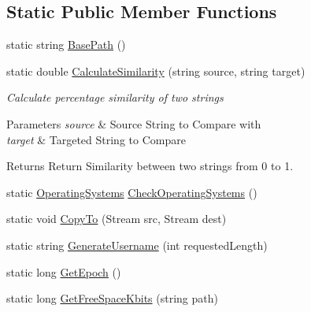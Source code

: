 \subsection*{Static Public Member Functions}
\begin{DoxyCompactItemize}
\item 
static string \mbox{\hyperlink{class_little_weeb_library_1_1_static_classes_1_1_utility_methods_a9fe4cf5d219f0453436fe9c85ad261bf}{Base\+Path}} ()
\item 
static double \mbox{\hyperlink{class_little_weeb_library_1_1_static_classes_1_1_utility_methods_a376120497e647e8c20d6a68c288db292}{Calculate\+Similarity}} (string source, string target)
\begin{DoxyCompactList}\small\item\em Calculate percentage similarity of two strings 
\begin{DoxyParams}{Parameters}
{\em source} & Source String to Compare with\\
\hline
{\em target} & Targeted String to Compare\\
\hline
\end{DoxyParams}
\begin{DoxyReturn}{Returns}
Return Similarity between two strings from 0 to 1.
\end{DoxyReturn}
\end{DoxyCompactList}\item 
static \mbox{\hyperlink{class_little_weeb_library_1_1_static_classes_1_1_utility_methods_aad4a2807f22b8cb65b8db3cdc981a0b1}{Operating\+Systems}} \mbox{\hyperlink{class_little_weeb_library_1_1_static_classes_1_1_utility_methods_afc8c716f32bc35d59afdb287be06c3ca}{Check\+Operating\+Systems}} ()
\item 
static void \mbox{\hyperlink{class_little_weeb_library_1_1_static_classes_1_1_utility_methods_a4a514b7e55cf2285f4f16d778164695d}{Copy\+To}} (Stream src, Stream dest)
\item 
static string \mbox{\hyperlink{class_little_weeb_library_1_1_static_classes_1_1_utility_methods_a9304b6462a585dd9afa13818452638a7}{Generate\+Username}} (int requested\+Length)
\item 
static long \mbox{\hyperlink{class_little_weeb_library_1_1_static_classes_1_1_utility_methods_a12336d9e64983ddabaad8950486fafb2}{Get\+Epoch}} ()
\item 
static long \mbox{\hyperlink{class_little_weeb_library_1_1_static_classes_1_1_utility_methods_a76fa2aea99ce4b1ad4130cc18b1d5969}{Get\+Free\+Space\+Kbits}} (string path)

\end{DoxyCompactItemize}
